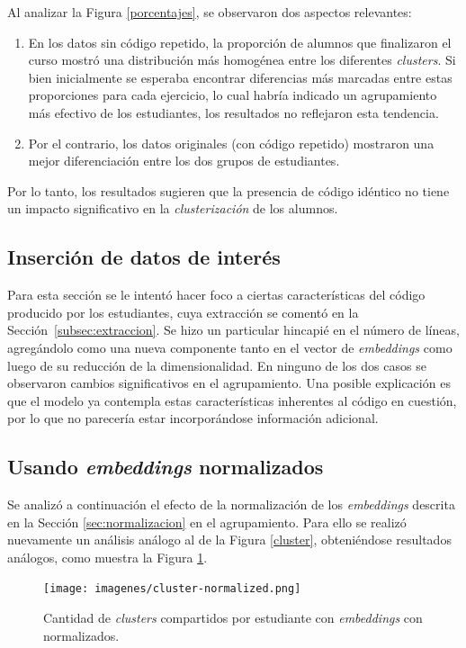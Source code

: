 \documentclass[11pt,a4paper,twoside,openany]{tesis}
\begin{document}
Al analizar la Figura \ref{porcentajes}, se observaron dos aspectos relevantes:
\begin{enumerate}
     \item En los datos sin código repetido, la proporción de alumnos que finalizaron el curso mostró una distribución más homogénea entre los diferentes \emph{clusters}. Si bien inicialmente se esperaba encontrar diferencias más marcadas entre estas proporciones para cada ejercicio, lo cual habría indicado un agrupamiento más efectivo de los estudiantes, los resultados no reflejaron esta tendencia.
     \item Por el contrario, los datos originales (con código repetido) mostraron una mejor diferenciación entre los dos grupos de estudiantes.
\end{enumerate}
Por lo tanto, los resultados sugieren que la presencia de código idéntico no tiene un impacto significativo en la \emph{clusterización} de los alumnos.

\subsection{Inserción de datos de interés}
Para esta sección se le intentó hacer foco a ciertas características del código producido por los estudiantes, cuya extracción se comentó en la Sección~\ref{subsec:extraccion}. Se hizo un particular hincapié en el número de líneas, agregándolo como una nueva componente tanto en el vector de \emph{embeddings} como luego de su reducción de la dimensionalidad. En ninguno de los dos casos se observaron cambios significativos en el agrupamiento. Una posible explicación es que el modelo ya contempla estas características inherentes al código en cuestión, por lo que no parecería estar incorporándose información adicional. 


\subsection{Usando \emph{embeddings} normalizados}

Se analizó a continuación el efecto de la normalización de los \emph{embeddings} descrita en la Sección \ref{sec:normalizacion} en el agrupamiento. Para ello se realizó nuevamente un análisis análogo al de la Figura \ref{cluster}, obteniéndose resultados análogos, como muestra la Figura \ref{normalizados}.

\begin{figure}[H]
    \centering
    \texttt{[image: imagenes/cluster-normalized.png]}
    \caption{Cantidad de \emph{clusters} compartidos por estudiante con \emph{embeddings} con normalizados.}
    \label{normalizados}
\end{figure}
\end{document}
